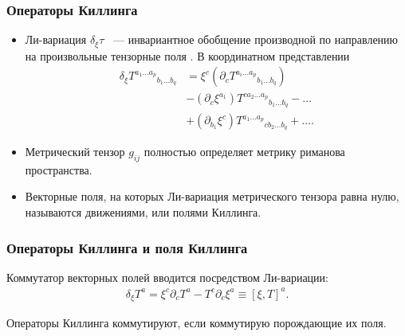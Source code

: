 \documentclass{beamer}
\begin{document}
    \begin{frame}\frametitle{Операторы Киллинга}

        \begin{itemize}

            \item Ли-вариация $\delta_\xi\tau$ ~--- инвариантное обобщение производной по направлению на произвольные тензорные поля \cite{lie_derivative_theory,symmetry_and_killing_fields}. В координатном представлении
            \begin{equation}\begin{aligned}
                \delta_\xi {T^{a_1 \dots a_p}}_{b_1 \dots b_q}
                    &= \xi^c \left( \partial_c {T^{a_i \dots a_p}}_{b_1 \dots b_q} \right) \\
                    &- \left( \partial_{c} \xi^{a_1} \right) {T^{c a_2 \dots a_p}}_{b_1 \dots b_q} - \dots \\
                    &+ \left( \partial_{b_1} \xi^c \right) {T^{a_1 \dots a_p}}_{c b_2 \dots b_q} + \dots .
            \end{aligned}\end{equation}

            \item Метрический тензор $g_{ij}$ полностью определяет метрику риманова пространства.

            \item Векторные поля, на которых Ли-вариация метрического тензора равна нулю, называются движениями, или полями Киллинга.

        \end{itemize}

    \end{frame}


    \begin{frame}\frametitle{Операторы Киллинга и поля Киллинга}

        Коммутатор векторных полей вводится посредством Ли-вариации:
        \begin{equation}\begin{aligned}\label{eq:vector_field_commutator}
            \delta_\xi T^a
                = \xi^c \partial_c T^a - T^c \partial_{c} \xi^a
                \equiv [\xi, T]^a.
        \end{aligned}\end{equation}

        \begin{theorem}[О коммутации]
            Операторы Киллинга коммутируют, если коммутирую порождающие их поля.
        \end{theorem}

    \end{frame}
\end{document}
